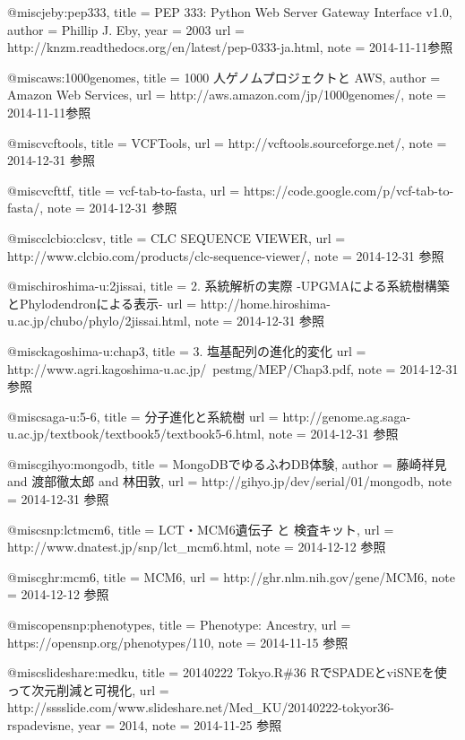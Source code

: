 @misc{jeby:pep333,
	title  = {PEP 333: Python Web Server Gateway Interface v1.0},
	author = {Phillip J. Eby},
	year   = {2003}
	url    = {http://knzm.readthedocs.org/en/latest/pep-0333-ja.html},
	note   = {2014-11-11参照}
}

@misc{aws:1000genomes,
	title  = {1000 人ゲノムプロジェクトと AWS},
	author = {Amazon Web Services},
	url    = {http://aws.amazon.com/jp/1000genomes/},
	note   = {2014-11-11参照}
}

@misc{vcftools,
	title  = {VCFTools},
	url    = {http://vcftools.sourceforge.net/},
	note   = {2014-12-31 参照}
}

@misc{vcfttf,
	title  = {vcf-tab-to-fasta},
	url    = {https://code.google.com/p/vcf-tab-to-fasta/},
	note   = {2014-12-31 参照}
}

@misc{clcbio:clcsv,
	title  = {CLC SEQUENCE VIEWER},
	url    = {http://www.clcbio.com/products/clc-sequence-viewer/},
	note   = {2014-12-31 参照}
}

@misc{hiroshima-u:2jissai,
	title  = {2. 系統解析の実際 -UPGMAによる系統樹構築とPhylodendronによる表示-}
	url    = {http://home.hiroshima-u.ac.jp/chubo/phylo/2jissai.html},
	note   = {2014-12-31 参照}
}

@misc{kagoshima-u:chap3,
	title  = {3. 塩基配列の進化的変化}
	url    = {http://www.agri.kagoshima-u.ac.jp/~pestmg/MEP/Chap3.pdf},
	note   = {2014-12-31 参照}
}

@misc{saga-u:5-6,
	title  = {分子進化と系統樹}
	url    = {http://genome.ag.saga-u.ac.jp/textbook/textbook5/textbook5-6.html},
	note   = {2014-12-31 参照}
}

@misc{gihyo:mongodb,
	title  = {MongoDBでゆるふわDB体験},
	author = {藤崎祥見 and 渡部徹太郎 and 林田敦},
	url    = {http://gihyo.jp/dev/serial/01/mongodb},
	note   = {2014-12-31 参照}
}

@misc{snp:lctmcm6,
	title  = {LCT・MCM6遺伝子 と 検査キット},
	url    = {http://www.dnatest.jp/snp/lct\_mcm6.html},
	note   = {2014-12-12 参照}
}

@misc{ghr:mcm6,
	title  = {MCM6},
	url    = {http://ghr.nlm.nih.gov/gene/MCM6},
	note   = {2014-12-12 参照}
}

@misc{opensnp:phenotypes,
	title  = {Phenotype: Ancestry},
	url    = {https://opensnp.org/phenotypes/110},
	note   = {2014-11-15 参照}
}

@misc{slideshare:medku,
	title  = {20140222 Tokyo.R\#36 RでSPADEとviSNEを使って次元削減と可視化},
	url    = {http://sssslide.com/www.slideshare.net/Med\_KU/20140222-tokyor36-rspadevisne},
	year   = {2014},
	note   = {2014-11-25 参照}
}


